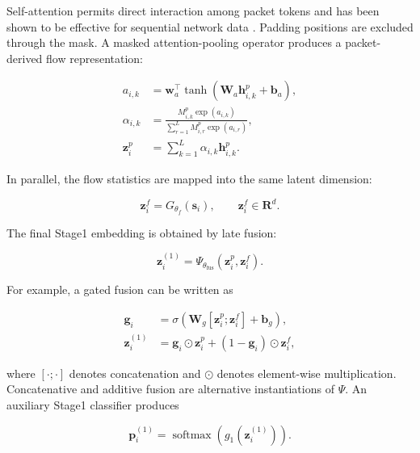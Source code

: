 Self-attention permits direct interaction among packet tokens and has been
shown to be effective for sequential network data
\cite{Vaswani2017,Manocchio2024FlowTransformer}. Padding positions are excluded
through the mask. A masked attention-pooling operator produces a packet-derived
flow representation:

\begin{align}
a_{i,k}
&=
\mathbf{w}_{a}^{\top}
\tanh(\mathbf{W}_{a}\mathbf{h}_{i,k}^{p}+\mathbf{b}_{a}),
\label{eq:attention_score}\\
\alpha_{i,k}
&=
\frac{
M_{i,k}^{p}\exp(a_{i,k})
}{
\sum_{r=1}^{L}M_{i,r}^{p}\exp(a_{i,r})
},
\label{eq:attention_weight}\\
\mathbf{z}_{i}^{p}
&=
\sum_{k=1}^{L}\alpha_{i,k}\mathbf{h}_{i,k}^{p}.
\label{eq:packet_embedding}
\end{align}

In parallel, the flow statistics are mapped into the same latent dimension:

\begin{equation}
\mathbf{z}_{i}^{f}=G_{\theta_f}(\mathbf{s}_i),
\qquad
\mathbf{z}_{i}^{f}\in\mathbf{R}^{d}.
\label{eq:flow_embedding}
\end{equation}

The final Stage1 embedding is obtained by late fusion:

\begin{equation}
\mathbf{z}_{i}^{(1)}
=
\Psi_{\theta_{\mathrm{fus}}}
\left(
\mathbf{z}_{i}^{p},\mathbf{z}_{i}^{f}
\right).
\label{eq:late_fusion}
\end{equation}

For example, a gated fusion can be written as

\begin{align}
\mathbf{g}_{i}
&=
\sigma\left(
\mathbf{W}_{g}
[\mathbf{z}_{i}^{p};\mathbf{z}_{i}^{f}]
+\mathbf{b}_{g}
\right),
\label{eq:fusion_gate}\\
\mathbf{z}_{i}^{(1)}
&=
\mathbf{g}_{i}\odot\mathbf{z}_{i}^{p}
+
(1-\mathbf{g}_{i})\odot\mathbf{z}_{i}^{f},
\label{eq:gated_fusion}
\end{align}

where $[\cdot;\cdot]$ denotes concatenation and $\odot$ denotes element-wise
multiplication. Concatenative and additive fusion are alternative
instantiations of $\Psi$. An auxiliary Stage1 classifier produces

\begin{equation}
\mathbf{p}_{i}^{(1)}
=
\operatorname{softmax}
\left(g_{1}(\mathbf{z}_{i}^{(1)})\right).
\label{eq:stage1_probability}
\end{equation}

